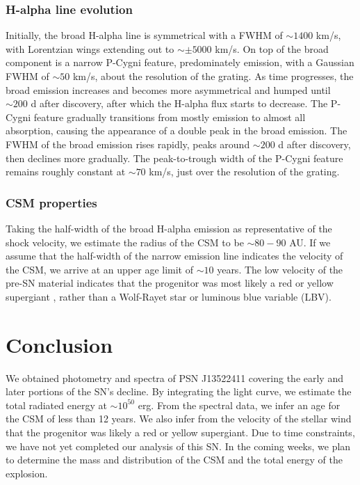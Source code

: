 \documentclass[iop]{emulateapj}
\begin{document}
\subsubsection{H-alpha line evolution}
Initially, the broad H-alpha line is symmetrical with a FWHM of $\sim1400$ km/s, with Lorentzian wings extending out to $\sim\pm5000$ km/s. On top of the broad component is a narrow P-Cygni feature, predominately emission, with a Gaussian FWHM of $\sim50$ km/s, about the resolution of the grating. As time progresses, the broad emission increases and becomes more asymmetrical and humped until $\sim200$ d after discovery, after which the H-alpha flux starts to decrease. The P-Cygni feature gradually transitions from mostly emission to almost all absorption, causing the appearance of a double peak in the broad emission. The FWHM of the broad emission rises rapidly, peaks around $\sim200$ d after discovery, then declines more gradually. The peak-to-trough width of the P-Cygni feature remains roughly constant at $\sim70$ km/s, just over the resolution of the grating.

\subsubsection{CSM properties}
Taking the half-width of the broad H-alpha emission as representative of the shock velocity, we estimate the radius of the CSM to be $\sim80-90$ AU. If we assume that the half-width of the narrow emission line indicates the velocity of the CSM, we arrive at an upper age limit of $\sim10$ years. The low velocity of the pre-SN material indicates that the progenitor was most likely a red or yellow supergiant \citep{Smi15}, rather than a Wolf-Rayet star or luminous blue variable (LBV).

\section{Conclusion}
We obtained photometry and spectra of PSN J13522411 covering the early and later portions of the SN's decline. By integrating the light curve, we estimate the total radiated energy at $\sim10^{50}$ erg. From the spectral data, we infer an age for the CSM of less than 12 years. We also infer from the velocity of the stellar wind that the progenitor was likely a red or yellow supergiant. Due to time constraints, we have not yet completed our analysis of this SN. In the coming weeks, we plan to determine the mass and distribution of the CSM and the total energy of the explosion.
\end{document}
